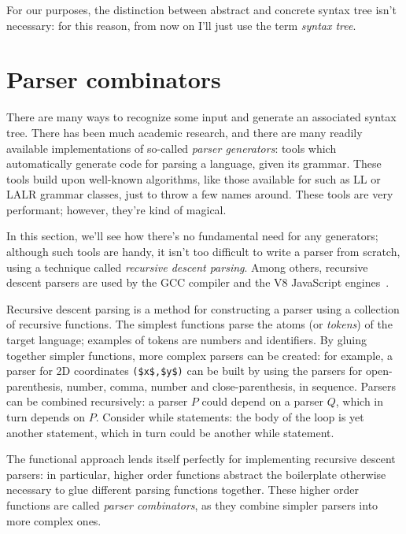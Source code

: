 \documentclass[UdineBachThesis,american,11pt]{PhdThesis}
\begin{document}
  For our purposes, the distinction between abstract and concrete syntax tree
  isn't necessary: for this reason, from now on I'll just use the term
  \emph{syntax tree}.

  \section{Parser combinators}
  \label{section:parsercombinators}

  There are many ways to recognize some input and generate an associated syntax
  tree. There has been much academic research, and there are many readily
  available implementations of so-called \emph{parser generators}: tools which
  automatically generate code for parsing a language, given its grammar. These
  tools build upon well-known algorithms, like those available for such as LL or
  LALR grammar classes, just to throw a few names around. These tools are very
  performant; however, they're kind of magical.

  In this section, we'll see how there's no fundamental need for any generators;
  although such tools are handy, it isn't too difficult to write a parser from
  scratch, using a technique called \emph{recursive descent parsing}. Among
  others, recursive descent parsers are used by the GCC compiler and the V8
  JavaScript engines~\cite{nystrom}.

  Recursive descent parsing is a method for constructing a parser using a
  collection of recursive functions. The simplest functions parse the atoms (or
  \emph{tokens}) of the target language; examples of tokens are numbers and
  identifiers. By gluing together simpler functions, more complex parsers can be
  created: for example, a parser for 2D coordinates
  \lstinline[mathescape]@($x$,$y$)@ can be built by using the parsers for
  open-parenthesis, number, comma, number and close-parenthesis, in sequence.
  Parsers can be combined recursively: a parser $P$ could depend on a parser
  $Q$, which in turn depends on $P$\@. Consider while statements: the body of
  the loop is yet another statement, which in turn could be another while
  statement.

  The functional approach lends itself perfectly for implementing recursive
  descent parsers: in particular, higher order functions abstract the
  boilerplate otherwise necessary to glue different parsing functions together.
  These higher order functions are called \emph{parser combinators}, as they
  combine simpler parsers into more complex ones.
\end{document}
